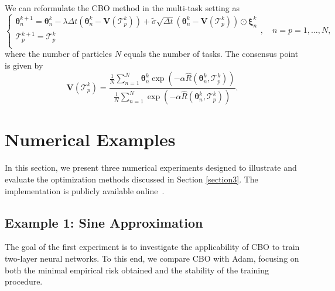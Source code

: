\documentclass[a4paper, 11pt]{article}
\theoremstyle{plain} %
\begin{document}
	We can reformulate the CBO method in the multi-task setting as 
	\begin{equation}\label{eq:multi_task_cbo}
	\begin{cases}
	\bm{\theta}_{n}^{k+1} = \bm{\theta}_{n}^{k} -\lambda \Delta t \left(\bm{\theta}_{n}^{k} - \bm{V}\left(\mathcal{T}_{p}^{k}\right) \right) + \tilde{\sigma} \sqrt{\Delta t}\left( \bm{\theta}_{n}^{k} - \bm{V}\left(\mathcal{T}_{p}^{k}\right) \right)\odot\bm{\xi}_{n}^{k}\\
	\mathcal{T}_{p}^{k+1} = \mathcal{T}_{p}^{k}\\
	\end{cases}, \quad n = p = 1, \dots, N,
	\end{equation}
	where the number of particles $ N $ equals the number of tasks. The consensus point is given by
	\begin{equation}
		\bm{V}\left(\mathcal{T}_{p}^{k}\right) = \frac{\frac{1}{N}\sum_{n=1}^{N}\bm{\theta}^{k}_{n}\exp\left( -\alpha \hat{R}\left(\bm{\theta}^{k}_{n}, \mathcal{T}_{p}^{k}\right)\right)}{ \frac{1}{N}\sum_{n=1}^{N}\exp\left( -\alpha \hat{R}\left(\bm{\theta}^{k}_{n}, \mathcal{T}_{p}^{k}\right)\right)}.
	\end{equation}


	\section{Numerical Examples}\label{section4}

	In this section, we present three numerical experiments designed to illustrate and evaluate the \mbox{optimization} methods discussed in Section \ref{section3}. The implementation is publicly available online~\cite{WilliamCode}.

	\subsection{Example 1: Sine Approximation}
	The goal of the first experiment is to investigate the applicability of CBO to train two-layer neural networks. To this end, we compare CBO with Adam, focusing on both the minimal empirical risk obtained and the stability of the training procedure. 
	
\end{document}
